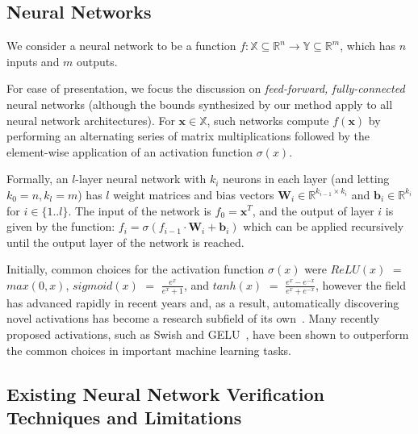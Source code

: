 \subsection{Neural Networks}

We consider a neural network to be a function $ f: \mathbb{X} \subseteq
\mathbb{R}^n \to \mathbb{Y} \subseteq \mathbb{R}^m $, which has $ n $ inputs
and $ m $ outputs.
%

%
For ease of presentation, we focus the discussion
on \textit{feed-forward, fully-connected} neural networks (although
the bounds synthesized by our method apply to all neural
network architectures).
%
For $ \mathbf{x} \in \mathbb{X} $, such networks compute $ f(\mathbf{x}) $ by
performing an alternating
series of matrix multiplications followed by the element-wise
application of an activation function $
\sigma(x) $.


Formally, an $ l $-layer neural network with $ k_i $ neurons in each
layer (and letting $ k_0 = n, k_l = m $) has $ l $ weight matrices
and bias vectors $ \mathbf{W}_i \in \mathbb{R}^{k_{i-1} \times k_i} $
and $ \mathbf{b}_i
\in \mathbb{R}^{k_{i}} $ for $ i \in \{1..l\} $. The input of the network is $
f_0 =
\mathbf{x}^T $, and the output of layer $ i $ is given by the function:
$ f_i = \sigma(f_{i-1} \cdot \mathbf{W}_i + \mathbf{b}_i) $
which can be applied recursively until the output layer of the network is reached.

Initially, common choices for the activation function $ \sigma(x) $ were $
ReLU(x) $  $ = $  $ max(0, x) $, $
sigmoid(x) $  $ = $  $ \frac{e^x}{e^x + 1} $, and $ tanh(x) $  $ = $  $ \frac{e^x
- e^{-x}}{e^x + e^{-x}}  $, however the field has advanced rapidly in recent
years and, as a result,
automatically discovering novel activations has become a
research subfield of its own~\cite{ramachandran2017searching}. Many recently proposed activations,
such as Swish and GELU~\cite{ramachandran2017searching,hendrycks2016gaussian},
have been shown to outperform the common choices in important machine learning tasks.


\subsection{Existing Neural Network Verification Techniques and Limitations}

